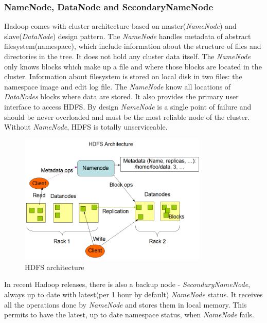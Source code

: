 \documentclass[a4paper,12pt,oneside]{report}
\begin{document}
		\subsubsection{NameNode, DataNode and SecondaryNameNode}
Hadoop comes with cluster architecture based on master(\textit{NameNode}) and\\ slave(\textit{DataNode}) design pattern. 
The \textit{NameNode} handles metadata of abstract filesystem(namespace), which include
information about the structure of files and directories in the tree.  It does not hold any cluster data itself. 
The  \textit{NameNode} only knows blocks which make up a file and where those blocks are located in the cluster.
Information about filesystem is stored on local disk in two files: the namespace image and edit log file. 
The \textit{NameNode} know all locations of  \textit{DataNodes} blocks where data 
are stored. It also provides the primary user interface to access HDFS. 
By design \textit{NameNode}  is a single point of failure and should be never overloaded and must 
be the most reliable node of the cluster.  Without \textit{NameNode}, HDFS is totally unserviceable. 
\begin{figure}[!htbp]
	\centering
	\includegraphics[width=0.8\textwidth]{./img/hdfsarchitecture.png}
	\caption[HDFS architecture1]{\centering HDFS architecture \footnotemark}
	\label{hdfs_arch}
\end{figure} 
In recent Hadoop releases, there is also a backup node - \textit{SecondaryNameNode}, always up to date 
with latest(per 1 hour by default) \textit{NameNode} status. It receives all the operations done by \textit{NameNode} and 
stores them in local memory. This permits to have the latest, up to date namespace status, when \textit{NameNode} fails. 
        
\end{document}
